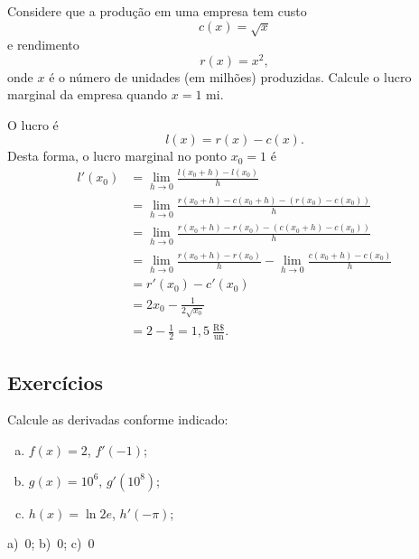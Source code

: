 \begin{exeresol}
  Considere que a produção em uma empresa tem custo
  \begin{equation}
    c(x) = \sqrt{x}
  \end{equation}
  e rendimento
  \begin{equation}
    r(x) = x^2,
  \end{equation}
  onde $x$ é o número de unidades (em milhões) produzidas. Calcule o lucro marginal da empresa quando $x=1$ mi.
\end{exeresol}
\begin{resol}
  O lucro é
  \begin{equation}
    l(x) = r(x) - c(x).
  \end{equation}
  Desta forma, o lucro marginal no ponto $x_0=1$ é
  \begin{align}
    l'(x_0) &= \lim_{h\to 0} \frac{l(x_0+h)-l(x_0)}{h}\\
            &= \lim_{h\to 0} \frac{r(x_0+h)-c(x_0+h)-(r(x_0)-c(x_0))}{h}\\
            &= \lim_{h\to 0} \frac{r(x_0+h)-r(x_0) - (c(x_0+h)-c(x_0))}{h}\\
            &= \lim_{h\to 0} \frac{r(x_0+h)-r(x_0)}{h} - \lim_{h\to 0} \frac{c(x_0+h)-c(x_0)}{h}\\
            &= r'(x_0) - c'(x_0)\\
            &= 2x_0 - \frac{1}{2\sqrt{x_0}}\\
            &= 2 - \frac{1}{2} = 1,5~\frac{\text{R\$}}{\text{un}}.
  \end{align}
\end{resol}


\subsection*{Exercícios}

\begin{exer}
  Calcule as derivadas conforme indicado:
  \begin{enumerate}[a)]
  \item $f(x) = 2$, $f'(-1)$;
  \item $g(x) = 10^6$, $g'(10^8)$;
  \item $h(x) = \ln 2e$, $h'(-\pi)$;
  \end{enumerate}
\end{exer}
\begin{resp}
  a)~$0$; b)~$0$; c)~$0$
\end{resp}

